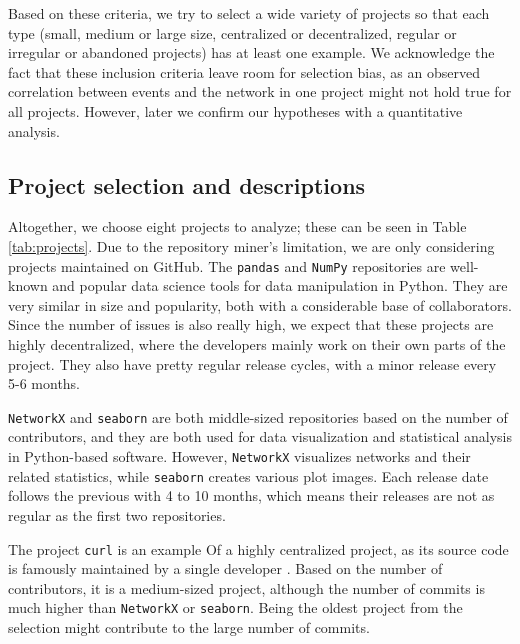 Based on these criteria, we try to select a wide variety of projects so that each type (small, medium or large size, centralized or decentralized, regular or irregular or abandoned projects) has at least one example. We acknowledge the fact that these inclusion criteria leave room for selection bias, as an observed correlation between events and the network in one project might not hold true for all projects. However, later we confirm our hypotheses with a quantitative analysis.

\subsection{Project selection and descriptions}

Altogether, we choose eight projects to analyze; these can be seen in Table \ref{tab:projects}. Due to the repository miner's limitation, we are only considering projects maintained on GitHub. The \texttt{pandas} and \texttt{NumPy} repositories are well-known and popular data science tools for data manipulation in Python. They are very similar in size and popularity, both with a considerable base of collaborators. Since the number of issues is also really high, we expect that these projects are highly decentralized, where the developers mainly work on their own parts of the project. They also have pretty regular release cycles, with a minor release every 5-6 months.

\texttt{NetworkX} and \texttt{seaborn} are both middle-sized repositories based on the number of contributors, and they are both used for data visualization and statistical analysis in Python-based software. However, \texttt{NetworkX} visualizes networks and their related statistics, while \texttt{seaborn} creates various plot images. Each release date follows the previous with 4 to 10 months, which means their releases are not as regular as the first two repositories.

The project \texttt{curl} is an example Of a highly centralized project, as its source code is famously maintained by a single developer \cite{crowstonHierarchyCentralizationFree2006}. Based on the number of contributors, it is a medium-sized project, although the number of commits is much higher than \texttt{NetworkX} or \texttt{seaborn}. Being the oldest project from the selection might contribute to the large number of commits.

